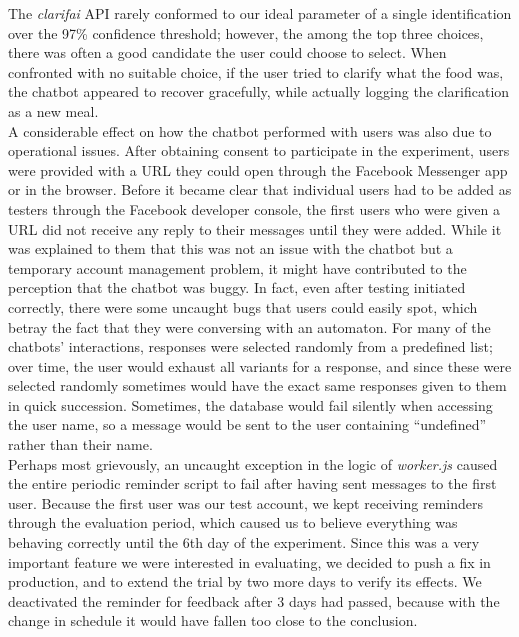 The \textit{clarifai} API rarely conformed to our ideal parameter of a single identification over the 97\% confidence threshold; however, the among the top three choices, there was often a good candidate the user could choose to select. When confronted with no suitable choice, if the user tried to clarify what the food was, the chatbot appeared to recover gracefully, while actually logging the clarification as a new meal. \\
A considerable effect on how the chatbot performed with users was also due to operational issues. After obtaining consent to participate in the experiment, users were provided with a URL they could open through the Facebook Messenger app or in the browser. Before it became clear that individual users had to be added as testers through the Facebook developer console, the first users who were given a URL did not receive any reply to their messages until they were added. While it was explained to them that this was not an issue with the chatbot but a temporary account management problem, it might have contributed to the perception that the chatbot was buggy. In fact, even after testing initiated correctly, there were some uncaught bugs that users could easily spot, which betray the fact that they were conversing with an automaton. For many of the chatbots' interactions, responses were selected randomly from a predefined list; over time, the user would exhaust all variants for a response, and since these were selected randomly sometimes would have the exact same responses given to them in quick succession. Sometimes, the database would fail silently when accessing the user name, so a message would be sent to the user containing ``undefined'' rather than their name. \\
Perhaps most grievously, an uncaught exception in the logic of \textit{worker.js} caused the entire periodic reminder script to fail after having sent messages to the first user. Because the first user was our test account, we kept receiving reminders through the evaluation period, which caused us to believe everything was behaving correctly until the 6th day of the experiment. Since this was a very important feature we were interested in evaluating, we decided to push a fix in production, and to extend the trial by two more days to verify its effects. We deactivated the reminder for feedback after 3 days had passed, because with the change in schedule it would have fallen too close to the conclusion.
